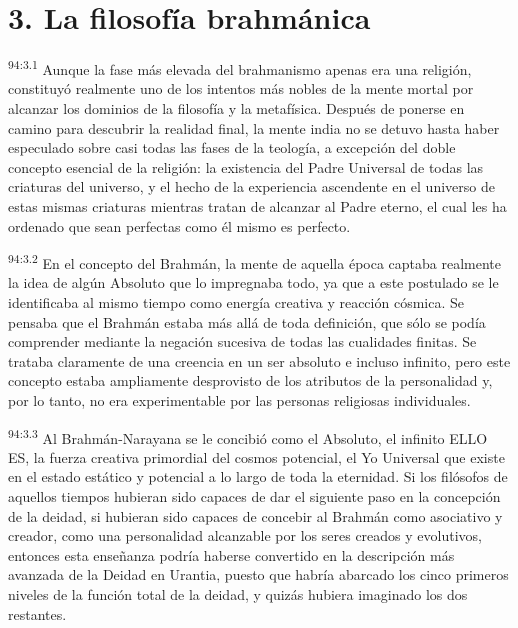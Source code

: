 \section*{3. La filosofía brahmánica}
\par
\textsuperscript{94:3.1} Aunque la fase más elevada del brahmanismo apenas era una religión, constituyó realmente uno de los intentos más nobles de la mente mortal por alcanzar los dominios de la filosofía y la metafísica. Después de ponerse en camino para descubrir la realidad final, la mente india no se detuvo hasta haber especulado sobre casi todas las fases de la teología, a excepción del doble concepto esencial de la religión: la existencia del Padre Universal de todas las criaturas del universo, y el hecho de la experiencia ascendente en el universo de estas mismas criaturas mientras tratan de alcanzar al Padre eterno, el cual les ha ordenado que sean perfectas como él mismo es perfecto.

\par
\textsuperscript{94:3.2} En el concepto del Brahmán, la mente de aquella época captaba realmente la idea de algún Absoluto que lo impregnaba todo, ya que a este postulado se le identificaba al mismo tiempo como energía creativa y reacción cósmica. Se pensaba que el Brahmán estaba más allá de toda definición, que sólo se podía comprender mediante la negación sucesiva de todas las cualidades finitas. Se trataba claramente de una creencia en un ser absoluto e incluso infinito, pero este concepto estaba ampliamente desprovisto de los atributos de la personalidad y, por lo tanto, no era experimentable por las personas religiosas individuales.

\par
\textsuperscript{94:3.3} Al Brahmán-Narayana se le concibió como el Absoluto, el infinito ELLO ES, la fuerza creativa primordial del cosmos potencial, el Yo Universal que existe en el estado estático y potencial a lo largo de toda la eternidad. Si los filósofos de aquellos tiempos hubieran sido capaces de dar el siguiente paso en la concepción de la deidad, si hubieran sido capaces de concebir al Brahmán como asociativo y creador, como una personalidad alcanzable por los seres creados y evolutivos, entonces esta enseñanza podría haberse convertido en la descripción más avanzada de la Deidad en Urantia, puesto que habría abarcado los cinco primeros niveles de la función total de la deidad, y quizás hubiera imaginado los dos restantes.

